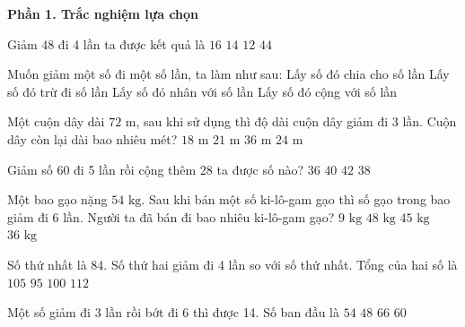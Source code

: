 \textbf{Phần 1. Trắc nghiệm lựa chọn}

\begin{ex} %
Giảm 48 đi 4 lần ta được kết quả là
\choice
{$16$}
{$14$}
{\True $12$}
{$44$}
\end{ex}

\begin{ex} %
Muốn giảm một số đi một số lần, ta làm như sau:
\choice
{\True Lấy số đó chia cho số lần}
{Lấy số đó trừ đi số lần}
{Lấy số đó nhân với số lần}
{Lấy số đó cộng với số lần}
\end{ex}

\begin{ex} %
Một cuộn dây dài $72\text{ m}$, sau khi sử dụng thì độ dài cuộn dây giảm đi 3 lần. Cuộn dây còn lại dài bao nhiêu mét?
\choice
{$18\text{ m}$}
{$21\text{ m}$}
{$36\text{ m}$}
{\True $24\text{ m}$}
\end{ex}

\begin{ex} %
Giảm số 60 đi 5 lần rồi cộng thêm 28 ta được số nào?
\choice
{$36$}
{\True $40$}
{$42$}
{$38$}
\end{ex}

\begin{ex} %
Một bao gạo nặng $54\text{ kg}$. Sau khi bán một số ki-lô-gam gạo thì số gạo trong bao giảm đi 6 lần. Người ta đã bán đi bao nhiêu ki-lô-gam gạo?
\choice
{$9\text{ kg}$}
{$48\text{ kg}$}
{\True $45\text{ kg}$}
{$36\text{ kg}$}
\end{ex}

\begin{ex} %
Số thứ nhất là 84. Số thứ hai giảm đi 4 lần so với số thứ nhất. Tổng của hai số là
\choice
{\True $105$}
{$95$}
{$100$}
{$112$}
\end{ex}

\begin{ex} %
Một số giảm đi 3 lần rồi bớt đi 6 thì được 14. Số ban đầu là
\choice
{$54$}
{$48$}
{$66$}
{\True $60$}
\end{ex}

